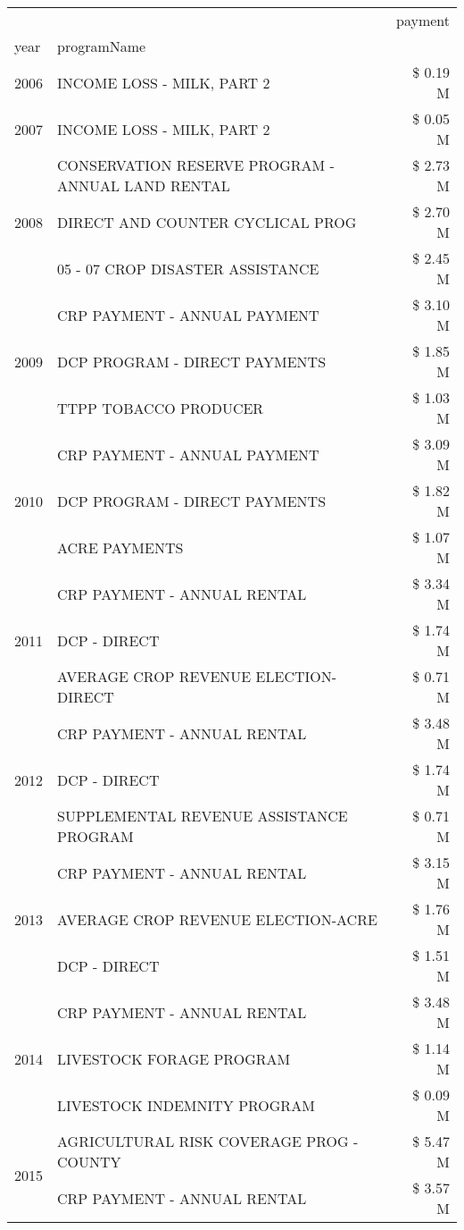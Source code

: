 \begin{tabular}{llr}
\toprule
 &  & payment \\
year & programName &  \\
\midrule
2006 & INCOME LOSS - MILK, PART 2 & \$ 0.19 M \\
\cline{1-3}
2007 & INCOME LOSS - MILK, PART 2 & \$ 0.05 M \\
\cline{1-3}
\multirow[t]{3}{*}{2008} & CONSERVATION RESERVE PROGRAM - ANNUAL LAND RENTAL & \$ 2.73 M \\
 & DIRECT AND COUNTER CYCLICAL PROG & \$ 2.70 M \\
 & 05 - 07 CROP DISASTER ASSISTANCE & \$ 2.45 M \\
\cline{1-3}
\multirow[t]{3}{*}{2009} & CRP PAYMENT - ANNUAL PAYMENT & \$ 3.10 M \\
 & DCP PROGRAM - DIRECT PAYMENTS & \$ 1.85 M \\
 & TTPP TOBACCO PRODUCER & \$ 1.03 M \\
\cline{1-3}
\multirow[t]{3}{*}{2010} & CRP PAYMENT - ANNUAL PAYMENT & \$ 3.09 M \\
 & DCP PROGRAM - DIRECT PAYMENTS & \$ 1.82 M \\
 & ACRE PAYMENTS & \$ 1.07 M \\
\cline{1-3}
\multirow[t]{3}{*}{2011} & CRP PAYMENT - ANNUAL RENTAL & \$ 3.34 M \\
 & DCP - DIRECT & \$ 1.74 M \\
 & AVERAGE CROP REVENUE ELECTION-DIRECT & \$ 0.71 M \\
\cline{1-3}
\multirow[t]{3}{*}{2012} & CRP PAYMENT - ANNUAL RENTAL & \$ 3.48 M \\
 & DCP - DIRECT & \$ 1.74 M \\
 & SUPPLEMENTAL REVENUE ASSISTANCE PROGRAM & \$ 0.71 M \\
\cline{1-3}
\multirow[t]{3}{*}{2013} & CRP PAYMENT - ANNUAL RENTAL & \$ 3.15 M \\
 & AVERAGE CROP REVENUE ELECTION-ACRE & \$ 1.76 M \\
 & DCP - DIRECT & \$ 1.51 M \\
\cline{1-3}
\multirow[t]{3}{*}{2014} & CRP PAYMENT - ANNUAL RENTAL & \$ 3.48 M \\
 & LIVESTOCK FORAGE PROGRAM & \$ 1.14 M \\
 & LIVESTOCK INDEMNITY PROGRAM & \$ 0.09 M \\
\cline{1-3}
\multirow[t]{3}{*}{2015} & AGRICULTURAL RISK COVERAGE PROG - COUNTY & \$ 5.47 M \\
 & CRP PAYMENT - ANNUAL RENTAL & \$ 3.57 M \\

\end{tabular}
